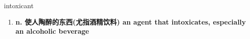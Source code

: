 
\begin{frame}
{\huge intoxicant}
\begin{center}
\begin{enumerate}\Large
  \item \textbf{n. 使人陶醉的东西(尤指酒精饮料) an agent that intoxicates, especially an alcoholic beverage}
\end{enumerate}
\end{center}
\end{frame}

